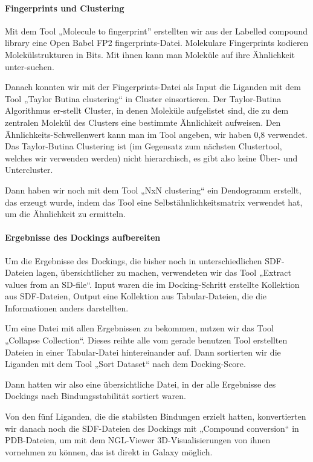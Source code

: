 \documentclass[11pt]{article}
\begin{document}
    \paragraph{Fingerprints und Clustering}
    Mit dem Tool „Molecule to fingerprint” erstellten wir aus der Labelled compound library eine Open Babel FP2 fingerprints-Datei. Molekulare Fingerprints kodieren Molekülstrukturen in Bits. Mit ihnen kann man Moleküle auf ihre Ähnlichkeit unter-suchen.

    Danach konnten wir mit der Fingerprints-Datei als Input die Liganden mit dem Tool „Taylor Butina clustering“ in Cluster einsortieren. Der Taylor-Butina Algorithmus er-stellt Cluster, in denen Moleküle aufgelistet sind, die zu dem zentralen Molekül des Clusters eine bestimmte Ähnlichkeit aufweisen. Den Ähnlichkeits-Schwellenwert kann man im Tool angeben, wir haben 0,8 verwendet. Das Taylor-Butina Clustering ist (im Gegensatz zum nächsten Clustertool, welches wir verwenden werden) nicht hierarchisch, es gibt also keine Über- und Untercluster.

    Dann haben wir noch mit dem Tool „NxN clustering“ ein Dendogramm erstellt, das erzeugt wurde, indem das Tool eine Selbstähnlichkeitsmatrix verwendet hat, um die Ähnlichkeit zu ermitteln.

    \paragraph{Ergebnisse des Dockings aufbereiten}
    Um die Ergebnisse des Dockings, die bisher noch in unterschiedlichen SDF-Dateien lagen, übersichtlicher zu machen, verwendeten wir das Tool „Extract values from an SD-file“. Input waren die im Docking-Schritt erstellte Kollektion aus SDF-Dateien, Output eine Kollektion aus Tabular-Dateien, die die Informationen anders darstellten.

    Um eine Datei mit allen Ergebnissen zu bekommen, nutzen wir das Tool „Collapse Collection“. Dieses reihte alle vom gerade benutzen Tool erstellten Dateien in einer Tabular-Datei hintereinander auf. Dann sortierten wir die Liganden mit dem Tool „Sort Dataset“ nach dem Docking-Score.

    Dann hatten wir also eine übersichtliche Datei, in der alle Ergebnisse des Dockings nach Bindungsstabilität sortiert waren.

    Von den fünf Liganden, die die stabilsten Bindungen erzielt hatten, konvertierten wir danach noch die SDF-Dateien des Dockings mit „Compound conversion“ in PDB-Dateien, um mit dem NGL-Viewer 3D-Visualisierungen von ihnen vornehmen zu können, das ist direkt in Galaxy möglich.
\end{document}
